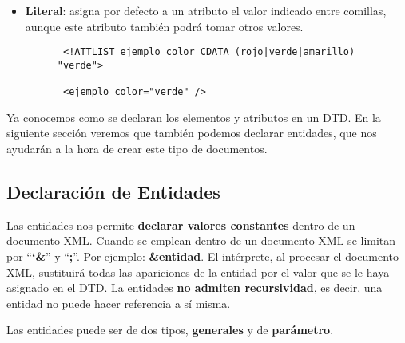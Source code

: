 \begin{itemize}
    \item \textbf{Literal}: asigna por defecto a un atributo el valor indicado entre comillas, aunque este atributo también podrá tomar otros valores.

    \begin{figure}[H]
        \begin{tcolorbox}[sharp corners, colback=yellow!30, colframe=white!20]
            \scriptsize
            \begin{verbatim}
 <!ATTLIST ejemplo color CDATA (rojo|verde|amarillo) "verde">

 <ejemplo color="verde" />
            \end{verbatim}
        \end{tcolorbox}
    \end{figure}
\end{itemize}

Ya conocemos como se declaran los elementos y atributos en un DTD. En la siguiente sección veremos que también podemos declarar entidades, que nos ayudarán a la hora de crear este tipo de documentos.

\subsection{Declaración de Entidades}
Las entidades nos permite \textbf{declarar valores constantes} dentro de un documento XML. Cuando se emplean dentro de un documento XML se limitan por ``\textbf{`\&}'' y ``\textbf{;}''. Por ejemplo: \textbf{\&entidad}. El intérprete, al procesar el documento XML, sustituirá todas las apariciones de la entidad por el valor que se le haya asignado en el DTD. La entidades \textbf{no admiten recursividad}, es decir, una entidad no puede hacer referencia a sí misma.

Las entidades puede ser de dos tipos, \textbf{generales} y de \textbf{parámetro}.

